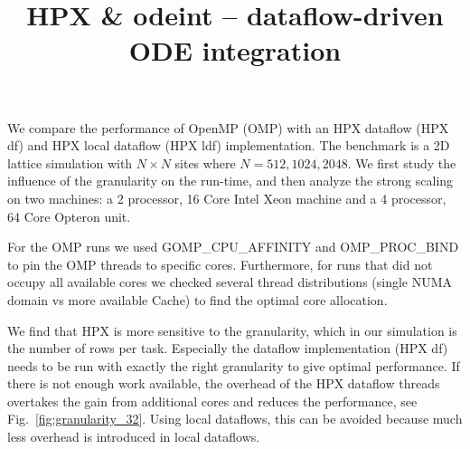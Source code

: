 \documentclass[a4wide,10pt]{scrartcl}
\title{HPX \& odeint -- dataflow-driven ODE integration}
\author{}
\begin{document}
\maketitle

We compare the performance of OpenMP (OMP) with an HPX dataflow (HPX df) and HPX local dataflow (HPX ldf) implementation.
The benchmark is a 2D lattice simulation with $N\times N$ sites where $N=512,1024,2048$.
We first study the influence of the granularity on the run-time, and then analyze the strong scaling on two machines: a 2 processor, 16 Core Intel Xeon machine and a 4 processor, 64 Core Opteron unit.

For the OMP runs we used GOMP\_CPU\_AFFINITY and OMP\_PROC\_BIND to pin the OMP threads to specific cores.
Furthermore, for runs that did not occupy all available cores we checked several thread distributions (single NUMA domain vs more available Cache) to find the optimal core allocation.

We find that HPX is more sensitive to the granularity, which in our simulation is the number of rows per task.
Especially the dataflow implementation (HPX df) needs to be run with exactly the right granularity to give optimal performance.
If there is not enough work available, the overhead of the HPX dataflow threads overtakes the gain from additional cores and reduces the performance, see Fig.~\ref{fig:granularity_32}.
Using local dataflows, this can be avoided because much less overhead is introduced in local dataflows.
\end{document}
